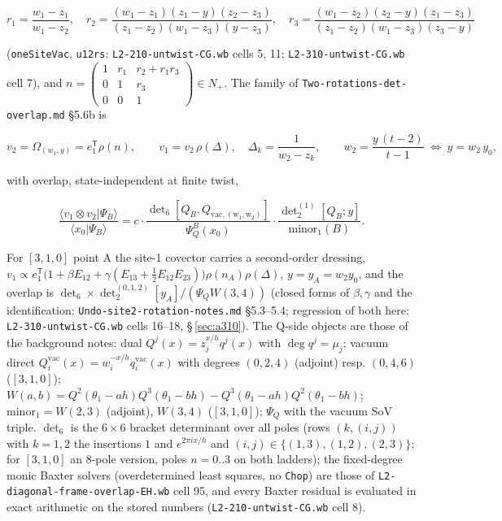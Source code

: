 \documentclass[10pt]{article}
\newcommand{\nb}[1]{\texttt{#1}}
\begin{document}
\[
r_1=\frac{w_1-z_1}{w_1-z_2},\quad r_2=\frac{(w_1-z_1)(z_1-y)(z_2-z_3)}{(z_1-z_2)(w_1-z_3)(y-z_3)},\quad r_3=\frac{(w_1-z_2)(z_2-y)(z_1-z_3)}{(z_1-z_2)(w_1-z_3)(z_3-y)}
\]

(\nb{oneSiteVac}, \nb{u12rs}: \nb{L2-\allowbreak{}210-\allowbreak{}untwist-\allowbreak{}CG.\allowbreak{}wb} cells 5, 11; \nb{L2-\allowbreak{}310-\allowbreak{}untwist-\allowbreak{}CG.\allowbreak{}wb} cell 7), and $n=\begin{pmatrix}1&r_1&r_2+r_1r_3\\0&1&r_3\\0&0&1\end{pmatrix}\in N_+$. The family of \nb{Two-\allowbreak{}rotations-\allowbreak{}det-\allowbreak{}overlap.\allowbreak{}md} \S{}5.6b is

\[
v_2=\Omega_{(w_1,y)}=e_1^{\mathsf T}\rho(n),\qquad v_1=v_2\,\rho(\Delta),\quad \Delta_k=\frac{1}{w_2-z_k},\qquad w_2=\frac{y\,(t-2)}{t-1}\ \Leftrightarrow\ y=w_2\,y_0,
\]

with overlap, state-independent at finite twist,

\[
\frac{\langle v_1\otimes v_2|\Psi_B\rangle}{\langle x_0|\Psi_B\rangle}=c\cdot\frac{\det\nolimits_6[Q_B,Q_{\mathrm{vac,(w_1,w_2)}}]}{\Psi_Q^B(x_0)}\cdot\frac{\det\nolimits_2^{(1)}[Q_B;y]}{\mathrm{minor}_1(B)} .
\]

For $[3,1,0]$ point A the site-1 covector carries a second-order dressing, $v_1\propto e_1^{\mathsf T}\bigl(1+\beta E_{12}+\gamma(E_{13}+\tfrac12E_{12}E_{23})\bigr)\rho(n_A)\rho(\Delta)$, $y=y_A=w_2y_0$, and the overlap is $\det_6\times\det_2^{(0,1,2)}[y_A]/(\Psi_QW(3,4))$ (closed forms of $\beta,\gamma$ and the identification: \nb{Undo-\allowbreak{}site2-\allowbreak{}rotation-\allowbreak{}notes.\allowbreak{}md} \S{}5.3--5.4; regression of both here: \nb{L2-\allowbreak{}310-\allowbreak{}untwist-\allowbreak{}CG.\allowbreak{}wb} cells 16--18, \S\,\ref{sec:a310}). The Q-side objects are those of the background notes: dual $Q^j(x)=z_j^{x/h}q^j(x)$ with $\deg q^j=\mu_j$; vacuum direct $Q_i^{\mathrm{vac}}(x)=w_i^{-x/h}q_i^{\mathrm{vac}}(x)$ with degrees $(0,2,4)$ (adjoint) resp. $(0,4,6)$ ($[3,1,0]$); $W(a,b)=Q^2(\theta_1-ah)Q^3(\theta_1-bh)-Q^3(\theta_1-ah)Q^2(\theta_1-bh)$; $\mathrm{minor}_1=W(2,3)$ (adjoint), $W(3,4)$ ($[3,1,0]$); $\Psi_Q$ with the vacuum SoV triple. $\det_6$ is the $6\times6$ bracket determinant over all poles (rows $(k,(i,j))$ with $k=1,2$ the insertions $1$ and $e^{2\pi ix/h}$ and $(i,j)\in\{(1,3),(1,2),(2,3)\}$; for $[3,1,0]$ an $8$-pole version, poles $n=0..3$ on both ladders); the fixed-degree monic Baxter solvers (overdetermined least squares, no \nb{Chop}) are those of \nb{L2-\allowbreak{}diagonal-\allowbreak{}frame-\allowbreak{}overlap-\allowbreak{}EH.\allowbreak{}wb} cell 95, and every Baxter residual is evaluated in exact arithmetic on the stored numbers (\nb{L2-\allowbreak{}210-\allowbreak{}untwist-\allowbreak{}CG.\allowbreak{}wb} cell 8).
\end{document}
